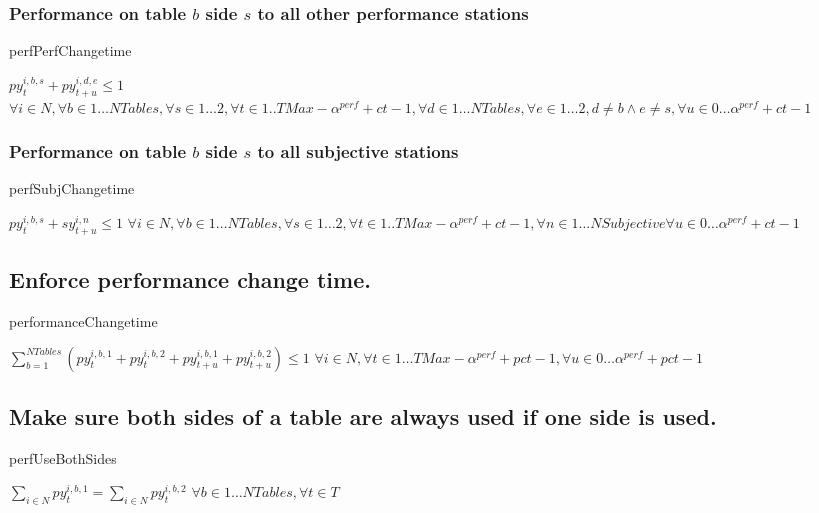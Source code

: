 \documentclass[letterpaper,11pt]{report}
\begin{document}
\subsubsection{Performance on table $b$ side $s$ to all other performance
  stations}
\begin{algorithm}
\caption{perfPerfChangetime}
$py_{t}^{i,b,s} + py_{t+u}^{i,d,e} \le 1$
\hfill $\forall i \in N,
\forall b \in 1 \dots NTables,
\forall s \in 1 \dots 2,
\forall t \in 1..{TMax-\alpha^{perf} + ct-1},
\forall d \in 1 \dots NTables ,
\forall e \in 1 \dots 2,
d \neq b  \wedge e \neq s,
\forall u \in 0 \dots \alpha^{perf}+ ct-1$
\end{algorithm}

\subsubsection{Performance on table $b$ side $s$ to all subjective
  stations}
\begin{algorithm}
\caption{perfSubjChangetime}
$py_{t}^{i,b,s} + sy_{t+u}^{i,n} \le 1$
\hfill $\forall i \in N,
\forall b \in 1 \dots NTables,
\forall s \in 1 \dots 2,
\forall t \in 1..{TMax-\alpha^{perf} + ct-1},
\forall n \in 1 \dots NSubjective
\forall u \in 0 \dots \alpha^{perf}+ ct-1$
\end{algorithm}

\FloatBarrier
\subsection{Enforce performance change time.}
\begin{algorithm}
\caption{performanceChangetime}
$
\sum\limits_{b=1}^{NTables} (
py_{t}^{i,b,1} + py_{t}^{i,b,2}
+
py_{t+u}^{i,b,1} + py_{t+u}^{i,b,2})
\le 1$
\hfill $\forall i \in N, 
\forall t \in 1 \dots TMax-\alpha^{perf} + pct-1,
\forall u \in 0 \dots \alpha^{perf} + pct-1$
\end{algorithm}

\FloatBarrier
\subsection{Make sure both sides of a table are always used if one side is
  used.}
\begin{algorithm}
\caption{perfUseBothSides}
$\sum\limits_{i \in N} py_{t}^{i,b,1} = \sum\limits_{i \in N}py_{t}^{i,b,2}$
\hfill $
\forall b \in 1 \dots NTables,
\forall t \in T$
\end{algorithm}
\end{document}

